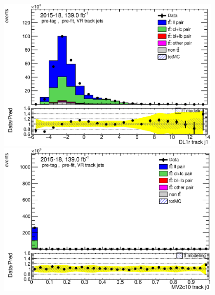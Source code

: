 \documentclass[letterpaper,12pt]{article}
\begin{document}
\begin{figure}[h]
\begin{minipage}[b]{.45\textwidth}
	\end{minipage}\hfill
	\begin{minipage}[b]{.45\textwidth}
	\centering
	\includegraphics[width=1\textwidth]{Oct_distributions/pretagNoRwDL1rwithhighpTVRJets_scaledall/DataMC__J1_DL1r.eps}
	\end{minipage}\hfill
	\begin{minipage}[b]{.45\textwidth}
	\centering
	\includegraphics[width=1\textwidth]{Oct_distributions/pretagNoRwDL1rwithhighpTVRJets_scaledall/DataMC_J0_MV2c10.eps}
	\end{minipage}\hfill
	\begin{minipage}[b]{.45\textwidth}
	\centering

\end{minipage}
\end{figure}
\end{document}
